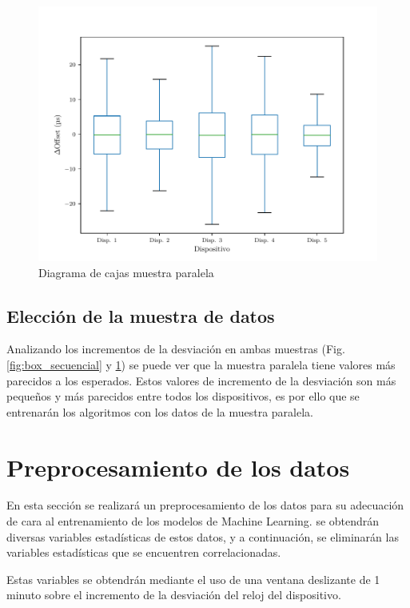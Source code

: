 \begin{figure}[htpb!]
    \centering
    \includegraphics[scale=0.7]{../Python/plots/parallel/boxplot_no_out}
    \caption{Diagrama de cajas muestra paralela}
    \label{fig:box_paralelo}
\end{figure}

\subsection{Elección de la muestra de datos}

Analizando los incrementos de la desviación en ambas muestras (Fig. \ref{fig:box_secuencial} y \ref{fig:box_paralelo}) se puede ver que la muestra paralela tiene valores más parecidos a los esperados. Estos valores de incremento de la desviación son más pequeños y más parecidos entre todos los dispositivos, es por ello que se entrenarán los algoritmos con los datos de la muestra paralela.

\section{Preprocesamiento de los datos}

En esta sección se realizará un preprocesamiento de los datos para su adecuación de cara al entrenamiento de los modelos de Machine Learning. se obtendrán diversas variables estadísticas de estos datos, y a continuación, se eliminarán las variables estadísticas que se encuentren correlacionadas.

Estas variables se obtendrán mediante el uso de una ventana deslizante de \SI{1}{} minuto sobre el incremento de la desviación del reloj del dispositivo.

